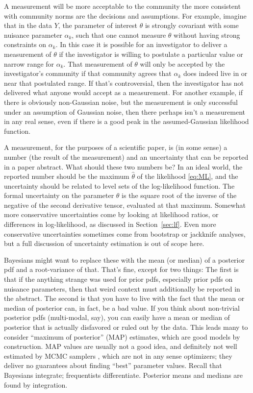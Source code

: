 \documentclass{article}
\newcommand{\sectionname}{Section}
\newcommand{\secref}[1]{\sectionname~\ref{#1}}
\begin{document}
A measurement will be more acceptable to the community the more consistent with community norms are the decisions and assumptions.
For example, imagine that in the data $Y$, the parameter of interest $\theta$ is strongly covariant with some nuisance parameter $\alpha_k$,
such that one cannot measure $\theta$ without having strong constraints on $\alpha_k$.
In this case it is possible for an investigator to deliver a measurement of $\theta$ if the investigator is willing to postulate a particular value or narrow range for $\alpha_k$.
That measurement of $\theta$ will only be accepted by the investigator's community if that community agrees that $\alpha_k$ does indeed live in or near that postulated range.
If that's controversial, then the investigator has not delivered what anyone would accept as a measurement.
For another example, if there is obviously non-Gaussian noise, but the measurement is only successful under an assumption of Gaussian noise, then there perhaps isn't a measurement in any real sense, even if there is a good peak in the assumed-Gaussian likelihood function.

A measurement, for the purposes of a scientific paper, is (in some sense) a number (the result of the measurement) and an uncertainty that can be reported in a paper abstract.
What should these two numbers be?
In an ideal world, the reported number should be the maximum $\hat\theta$ of the likelihood \eqref{eq:ML}, and the uncertainty should be related to level sets of the log-likelihood function.
The formal uncertainty on the parameter $\theta$ is the square root of the inverse of the negative of the second derivative tensor, evaluated at that maximum.
Somewhat more conservative uncertainties come by looking at likelihood ratios, or differences in log-likelihood, as discussed in \secref{sec:lf}.
Even more conservative uncertainties sometimes come from bootstrap \cite{bootstrap} or jackknife \cite{jackknife} analyses, but a full discussion of uncertainty estimation is out of scope here.

Bayesians might want to replace these with the mean (or median) of a posterior pdf and a root-variance of that.
That's fine, except for two things:
The first is that if the anything strange was used for prior pdfs, especially prior pdfs on nuisance parameters, then that weird context must additionally be reported in the abstract.
The second is that you have to live with the fact that the mean or median of posterior can, in fact, be a bad value.
If you think about non-trivial posterior pdfs (multi-modal, say), you can easily have a mean or median of posterior that is actually disfavored or ruled out by the data.
This leads many to consider ``maximum of posterior'' (MAP) estimates, which are good models by construction.
MAP values are usually not a good idea, and definitely not well estimated by MCMC samplers \cite{mcmc}, which are not in any sense optimizers; they deliver no guarantees about finding ``best'' parameter values.
Recall that Bayesians integrate; frequentists differentiate.
Posterior means and medians are found by integration.
\end{document}
